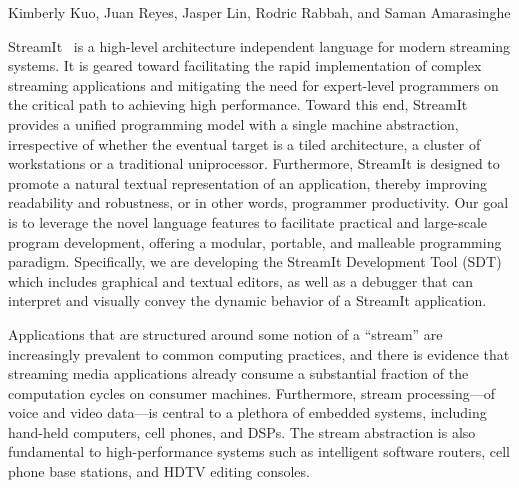 \documentclass{csailabstractbook}
\begin{document}


         {Kimberly Kuo, Juan Reyes, Jasper Lin, Rodric Rabbah, and Saman Amarasinghe}



StreamIt~\cite{streamitcc}  is a  high-level  architecture independent
language  for   modern  streaming   systems.   It  is   geared  toward
facilitating   the   rapid   implementation   of   complex   streaming
applications and  mitigating the need for  expert-level programmers on
the  critical path to  achieving high  performance.  Toward  this end,
StreamIt provides  a unified programming  model with a  single machine
abstraction,  irrespective of whether  the eventual  target is  a tiled
architecture, a cluster of workstations or a traditional uniprocessor.
Furthermore,  StreamIt  is  designed  to  promote  a  natural  textual
representation  of an application,  thereby improving  readability and
robustness, or  in other words, programmer productivity.   Our goal is
to leverage  the novel language  features to facilitate  practical and
large-scale  program development,  offering a  modular,  portable, and
malleable programming  paradigm.  Specifically, we  are developing the
StreamIt Development  Tool (SDT) which includes  graphical and textual
editors, as well as a  debugger that can interpret and visually convey
the dynamic behavior of a StreamIt application.


Applications that  are structured around  some notion of  a ``stream''
are increasingly prevalent to common computing practices, and there is
evidence   that  streaming  media   applications  already   consume  a
substantial fraction  of the computation cycles  on consumer machines.
Furthermore, stream processing---of  voice and video data---is central
to a plethora of embedded systems, including hand-held computers, cell
phones,  and  DSPs. The  stream  abstraction  is  also fundamental  to
high-performance  systems such as  intelligent software  routers, cell
phone base stations, and HDTV editing consoles.
\end{document}
